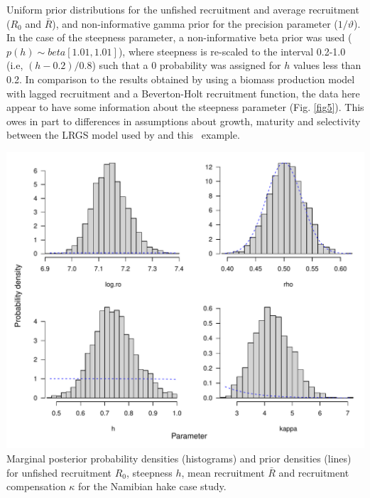 \begin{multicols}{2}
Uniform prior distributions for the unfished recruitment and average recruitment ($R_0$ and $\bar{R}$), and non-informative gamma prior for the precision parameter ($1/\vartheta$).  In the case of the steepness parameter, a non-informative beta prior was used ($p(h)\sim beta[1.01,1.01]$), where steepness is re-scaled to the interval 0.2-1.0 (i.e, $(h-0.2)/0.8$) such that a 0 probability was assigned for $h$ values less than 0.2.  In comparison to the results obtained by \cite{hilborn1997ecological} using a biomass production model with lagged recruitment and a Beverton-Holt recruitment function, the data here appear to have some information about the steepness parameter (Fig. \ref{fig5}).  This owes in part to differences in assumptions about growth, maturity and selectivity between the LRGS model used by \cite{hilborn1997ecological} and this \iscam\ example.

\begin{figurehere}
	\centering
	\includegraphics[width=0.9\columnwidth]{iscamFigs/nHakeparameters.pdf}\\
	\caption{Marginal posterior probability densities (histograms) and prior densities (lines) for unfished recruitment $R_0$, steepness $h$, mean recruitment $\bar{R}$ and recruitment compensation $\kappa$ for the Namibian hake case study.}\label{fig5}
\end{figurehere}


\end{multicols}
